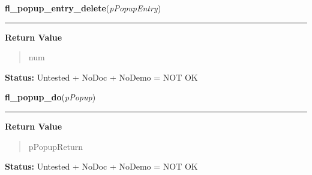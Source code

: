     \label{xformslib:library:fl_popup_entry_delete}

    \vspace{0.5ex}

\hspace{.8\funcindent}\begin{boxedminipage}{\funcwidth}

    \raggedright \textbf{fl\_popup\_entry\_delete}(\textit{pPopupEntry})

    \vspace{-1.5ex}

    \rule{\textwidth}{0.5\fboxrule}
\setlength{\parskip}{2ex}
\setlength{\parskip}{1ex}
      \textbf{Return Value}
    \vspace{-1ex}

      \begin{quote}
      num

      \end{quote}

\textbf{Status:} Untested + NoDoc + NoDemo = NOT OK



    \end{boxedminipage}

    \label{xformslib:library:fl_popup_do}

    \vspace{0.5ex}

\hspace{.8\funcindent}\begin{boxedminipage}{\funcwidth}

    \raggedright \textbf{fl\_popup\_do}(\textit{pPopup})

    \vspace{-1.5ex}

    \rule{\textwidth}{0.5\fboxrule}
\setlength{\parskip}{2ex}
\setlength{\parskip}{1ex}
      \textbf{Return Value}
    \vspace{-1ex}

      \begin{quote}
      pPopupReturn

      \end{quote}

\textbf{Status:} Untested + NoDoc + NoDemo = NOT OK



    \end{boxedminipage}

